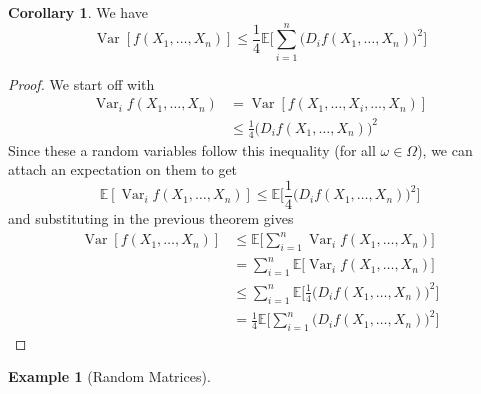 \documentclass{article}
\DeclareMathOperator{\Var}{Var}
\theoremstyle{definition}
\newtheorem{example}{Example}[section]
\newtheorem{corollary}{Corollary}[theorem]
\theoremstyle{remark}
\theoremstyle{definition}
\begin{document}
  \begin{corollary}
  We have 
  \[\Var[ f(X_1, \ldots, X_n)] \leq \frac{1}{4} \mathbb{E} \bigg[ \sum_{i=1}^n \big( D_i f(X_1, \ldots, X_n) \big)^2 \bigg] \]
  \end{corollary}
  \begin{proof}
  We start off with 
  \begin{align*}
      \Var_i f (X_1, \ldots, X_n) & = \Var[ f(X_1, \ldots, X_i, \ldots, X_n)] \\
      & \leq \frac{1}{4} \big( D_i f (X_1, \ldots, X_n)\big)^2 
  \end{align*}
  Since these a random variables follow this inequality (for all $\omega \in \Omega$), we can attach an expectation on them to get 
  \[\mathbb{E}[\Var_i f (X_1, \ldots, X_n)] \leq \mathbb{E} \bigg[ \frac{1}{4} \big( D_i f (X_1, \ldots, X_n)\big)^2\bigg] \]
  and substituting in the previous theorem gives 
  \begin{align*}
      \Var[f(X_1, \ldots, X_n)] & \leq \mathbb{E} \bigg[ \sum_{i=1}^n \Var_i f(X_1, \ldots, X_n) \bigg] \\
      & = \sum_{i=1}^n \mathbb{E}\big[ \Var_i f(X_1, \ldots, X_n) \big] \\
      & \leq \sum_{i=1}^n \mathbb{E} \bigg[ \frac{1}{4} \big( D_i f (X_1, \ldots, X_n)\big)^2\bigg] \\
      & = \frac{1}{4} \mathbb{E} \bigg[ \sum_{i=1}^n \big( D_i f(X_1, \ldots, X_n) \big)^2 \bigg] 
  \end{align*}
  \end{proof}

  \begin{example}[Random Matrices]

  \end{example}
\end{document}
